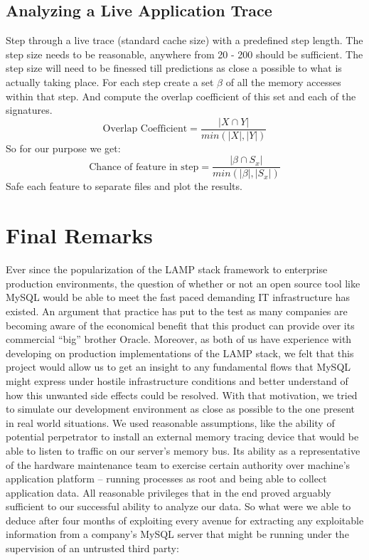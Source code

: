 \documentclass[11pt, oneside]{article}
\begin{document}
\subsection{Analyzing a Live Application Trace}
Step through a live trace (standard cache size) with a predefined step length. 
The step size needs to be reasonable, anywhere from 20 - 200 should be 
sufficient. The step size will need to be finessed till predictions as close a 
possible to what is actually taking place. For each step create a set $\beta$ 
of all the memory accesses within that step. And compute the overlap 
coefficient of this set and each of the signatures.
$$\text{Overlap Coefficient} = \frac{|X\cap Y|}{min(|X|,|Y|)}$$
So for our purpose we get:
$$\text{Chance of feature in step} = 
    \frac{|\beta\cap S_x|}{min(|\beta|, |S_x|)}$$
Safe each feature to separate files and plot the results.

\section{Final Remarks}
Ever since the popularization of the LAMP stack framework to enterprise 
production environments, the question of whether or not an open source tool 
like MySQL would be able to meet the fast paced demanding IT infrastructure 
has existed. An argument that practice has put to the test as many companies 
are becoming aware of the economical benefit that this product can provide 
over its commercial “big” brother Oracle. Moreover, as both of us have 
experience with developing on production implementations of the LAMP stack, we 
felt that this project would allow us to get an insight to any fundamental 
flows that MySQL might express under hostile infrastructure conditions and 
better understand of how this unwanted side effects could be resolved. With 
that motivation, we tried to simulate our development environment as close as 
possible to the one present in real world situations. We used reasonable 
assumptions, like the ability of potential perpetrator to install an external 
memory tracing device that would be able to listen to traffic on our server's 
memory bus. Its ability as a representative of the hardware maintenance team 
to exercise certain authority over machine's application platform – running 
processes as root and being able to collect application data. All reasonable 
privileges that in the end proved arguably sufficient to our successful 
ability to analyze our data.
So what were we able to deduce after four months of exploiting every avenue 
for extracting any exploitable information from a company's MySQL server that 
might be running under the supervision of an untrusted third party:
\end{document}
